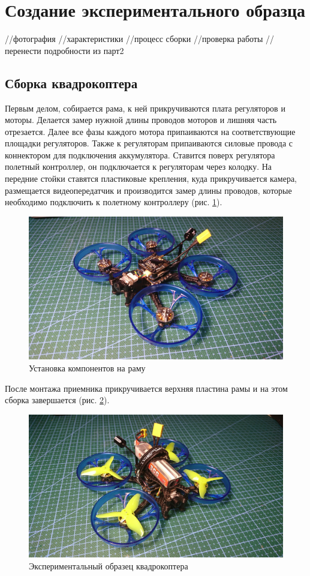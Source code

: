 
\section{Создание экспериментального образца}
//фотография
//характеристики
//процесс сборки
//проверка работы
//перенести подробности из парт2
\subsection{Сборка квадрокоптера}
Первым делом, собирается рама, к ней прикручиваются плата регуляторов и моторы. Делается замер нужной длины проводов моторов и лишняя часть отрезается. Далее все фазы каждого мотора припаиваются на соответствующие площадки регуляторов. Также к регуляторам припаиваются силовые провода с коннектором для подключения аккумулятора. Ставится поверх регулятора полетный контроллер, он подключается к регуляторам через колодку. На передние стойки ставятся пластиковые крепления, куда прикручивается камера, размещается видеопередатчик и производится замер длины проводов, которые необходимо подключить к полетному контроллеру (рис. \ref{fig:quad1}).
\begin{figure}[H]
	\centering
	\includegraphics[width=0.5\linewidth]{pics/quad1}
	\caption{Установка компонентов на раму
	}
	\label{fig:quad1}
\end{figure}
После монтажа приемника прикручивается верхняя пластина рамы и на этом сборка завершается (рис. \ref{fig:quad2}).
\begin{figure}[H]
	\centering
	\includegraphics[width=0.5\linewidth]{pics/quad2}
	\caption{Экспериментальный образец квадрокоптера
	}
	\label{fig:quad2}
\end{figure}

